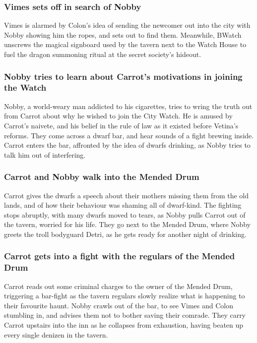 \subsubsection{\Gls{Vimes} sets off in search of \Gls{Nobby}}
\Gls{Vimes} is alarmed by \Gls{Colon}'s idea of sending the newcomer out into the city with
\Gls{Nobby} showing him the ropes, and sets out to find them. Meanwhile, \Gls{BWatch} unscrews the
magical signboard used by the tavern next to the Watch House to fuel the dragon summoning ritual at
the secret society's hideout.

\subsubsection{\Gls{Nobby} tries to learn about \Gls{Carrot}'s motivations in joining the Watch}
\Gls{Nobby}, a world-weary man addicted to his cigarettes, tries to wring the truth out from
\Gls{Carrot} about why he wished to join the City Watch. He is amused by \Gls{Carrot}'s naivete,
and his belief in the rule of law as it existed before \Gls{Vetina}'s reforms. They come across a
dwarf bar, and hear sounds of a fight brewing inside. \Gls{Carrot} enters the bar, affronted by the
idea of dwarfs drinking, as \Gls{Nobby} tries to talk him out of interfering.

\subsubsection{\Gls{Carrot} and \Gls{Nobby} walk into the Mended Drum}
\Gls{Carrot} gives the dwarfs a speech about their mothers missing them from the old lands, and of
how their behaviour was shaming all of dwarf-kind. The fighting stops abruptly, with many dwarfs
moved to tears, as \Gls{Nobby} pulls \Gls{Carrot} out of the tavern, worried for his life. They go
next to the Mended Drum, where \Gls{Nobby} greets the troll bodyguard \Gls{Detri}, as he gets ready
for another night of drinking.

\subsubsection{\Gls{Carrot} gets into a fight with the regulars of the Mended Drum}
\Gls{Carrot} reads out some criminal charges to the owner of the Mended Drum, triggering a bar-fight
as the tavern regulars slowly realize what is happening to their favourite haunt. \Gls{Nobby}
crawls out of the bar, to see \Gls{Vimes} and \Gls{Colon} stumbling in, and advises them not to
bother saving their comrade. They carry \Gls{Carrot} upstairs into the inn as he collapses from
exhaustion, having beaten up every single denizen in the tavern.

